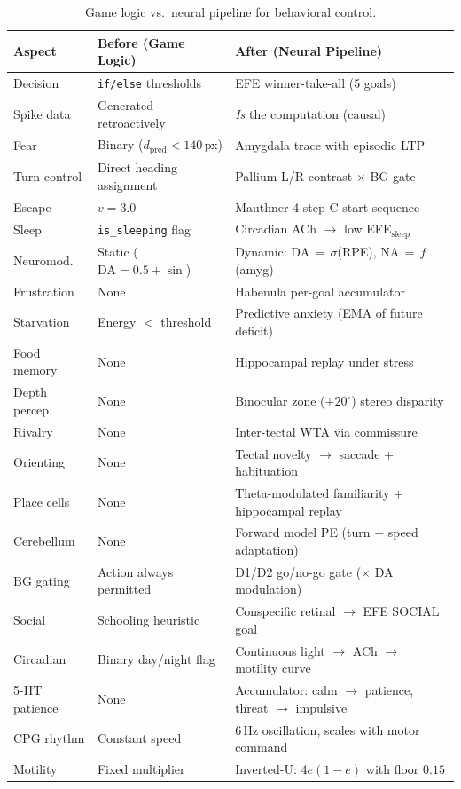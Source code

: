 \documentclass[11pt,a4paper]{article}
\begin{document}
\begin{table}[H]
\centering
\caption{Game logic vs.\ neural pipeline for behavioral control.}
\label{tab:game_vs_neural}
\small
\begin{tabular}{lll}
\toprule
Aspect & Before (Game Logic) & After (Neural Pipeline) \\
\midrule
Decision      & \texttt{if/else} thresholds & EFE winner-take-all (5 goals) \\
Spike data    & Generated retroactively     & \textit{Is} the computation (causal) \\
Fear          & Binary ($d_\text{pred} < 140$\,px) & Amygdala trace with episodic LTP \\
Turn control  & Direct heading assignment    & Pallium L/R contrast $\times$ BG gate \\
Escape        & $v = 3.0$                   & Mauthner 4-step C-start sequence \\
Sleep         & \texttt{is\_sleeping} flag   & Circadian ACh $\to$ low EFE$_\text{sleep}$ \\
Neuromod.     & Static ($\text{DA} = 0.5 + \sin$) & Dynamic: DA$\,{=}\,\sigma$(RPE), NA$\,{=}\,f$(amyg) \\
Frustration   & None                        & Habenula per-goal accumulator \\
Starvation    & Energy $<$ threshold         & Predictive anxiety (EMA of future deficit) \\
Food memory   & None                        & Hippocampal replay under stress \\
Depth percep. & None                        & Binocular zone ($\pm20^\circ$) stereo disparity \\
Rivalry       & None                        & Inter-tectal WTA via commissure \\
Orienting     & None                        & Tectal novelty $\to$ saccade + habituation \\
Place cells   & None                        & Theta-modulated familiarity + hippocampal replay \\
Cerebellum    & None                        & Forward model PE (turn $+$ speed adaptation) \\
BG gating     & Action always permitted     & D1/D2 go/no-go gate ($\times$ DA modulation) \\
Social        & Schooling heuristic         & Conspecific retinal $\to$ EFE SOCIAL goal \\
Circadian     & Binary day/night flag       & Continuous light $\to$ ACh $\to$ motility curve \\
5-HT patience & None                        & Accumulator: calm $\to$ patience, threat $\to$ impulsive \\
CPG rhythm    & Constant speed              & $6$\,Hz oscillation, scales with motor command \\
Motility      & Fixed multiplier            & Inverted-U: $4e(1{-}e)$ with floor $0.15$ \\
\bottomrule
\end{tabular}
\end{table}
\end{document}
